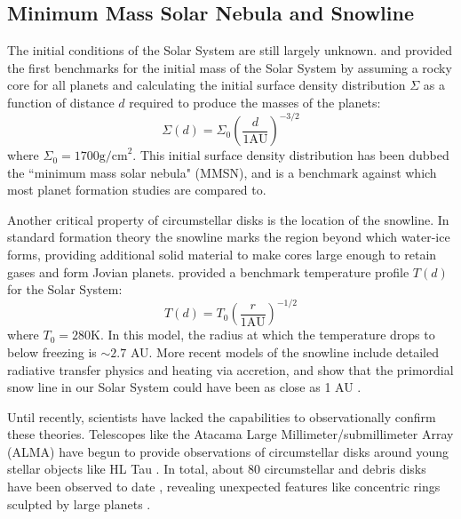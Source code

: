 \subsection{Minimum Mass Solar Nebula and Snowline}
The initial conditions of the Solar System are still largely unknown.
\citet{Hayashi1981} and \citet{Weidenschilling1977} provided the first benchmarks for the initial mass of the Solar System by assuming a rocky core for all planets and calculating the initial surface density distribution $\Sigma$ as a function of distance $d$ required to produce the masses of the planets:
\begin{equation}
\Sigma(d) = \Sigma_0\left(\frac{d}{1 \textrm{AU}} \right)^{-3/2}
\end{equation}
where $\Sigma_0 = 1700 \textrm{g/cm}^{2}$. 
This initial surface density distribution has been dubbed the ``minimum mass solar nebula" (MMSN), and is a benchmark against which most planet formation studies are compared to.


Another critical property of circumstellar disks is the location of the snowline. 
In standard formation theory the snowline marks the region beyond which water-ice forms, providing additional solid material to make cores large enough to retain gases and form Jovian planets.
\citet{Hayashi1981} provided a benchmark temperature profile $T(d)$ for the Solar System:
\begin{equation}
T(d) = T_0 \left(\frac{r}{1 \textrm{AU}} \right)^{-1/2}
\end{equation}
where $T_0 = 280$K. 
In this model, the radius at which the temperature drops to below freezing is $\sim 2.7$ AU. 
More recent models of the snowline \citep{Sasselov2000} include detailed radiative transfer physics and heating via accretion, and show that the primordial snow line in our Solar System could have been as close as 1 AU .

Until recently, scientists have lacked the capabilities to observationally confirm these theories.  
Telescopes like the Atacama Large Millimeter/submillimeter Array (ALMA) have begun to provide observations of circumstellar disks around young stellar objects like HL Tau \citep{ALMA2015}.
In total, about 80 circumstellar and debris disks have been observed to date \citep[e.g.][]{Schneider2014,Choquet2016}, revealing unexpected features like concentric rings sculpted by large planets \citep{Tamayo2015}.

